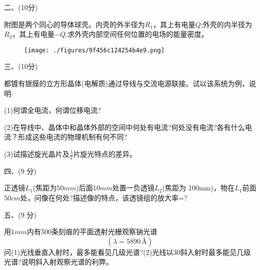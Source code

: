 二、(10分)

附图是两个同心的导体球壳。内壳的外半径为$R_1$，其上有电量$Q$;外壳的内半径为$R_2$，其上有电量$-Q$.求外壳内部空间任何位置的电场的能量密度。
\begin{figure}[ht]
\centering
\texttt{[image: ./figures/9f456c124254b4e9.png]}
\caption{} \label{fig_PKU199_4}
\end{figure}

三、(10分)

都镀有银膜的立方形晶体(电解质)通过导线与交流电源联接。试以该系统为例，说明:

(1)何谓全电流，何谓位移电流?

(2)在导线中、晶体中和晶体外部的空间中何处有电流?何处没有电流?各有什么电流？形成这些电流的物理机制有何不同?

(3)试描述旋光晶片及$\frac{\lambda}{2}$片旋光特点的差异。

四、(9 分)

正透镜$L_1$(焦距为$50mm$)后面$10mm$处置一负透镜$L_2$(焦距为 100mm)，物在$L_1$前面$50cm$处，问像在何处?描述像的特点，该透镜组的放大率=?

五、(9 分)

用$1mm$内有500条刻痕的平面透射光栅观察钠光谱$$\left( \lambda = 5890 \, \text{\AA} \right)~$$
 问(1)光线垂直入射时，最多能看见几级光谱?(2)光线以30斜入射时最多能见几级光谱?说明斜入射观察光谱的利弊。